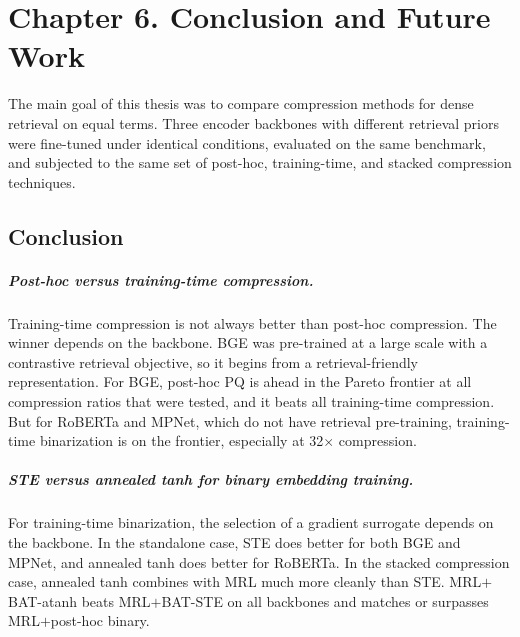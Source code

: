 
\chapter{Chapter 6. Conclusion and Future Work}
\label{ch:conclusions}

The main goal of this thesis was to compare compression methods for
dense retrieval on equal terms. Three encoder backbones with different
retrieval priors were fine-tuned under identical conditions, evaluated
on the same benchmark, and subjected to the same set of post-hoc,
training-time, and stacked compression techniques.

\section{Conclusion}
\label{sec:conclusion}

\paragraph{Post-hoc versus training-time compression.}
Training-time compression is not always better than post-hoc
compression. The winner depends on the backbone. BGE was pre-trained
at a large scale with a contrastive retrieval objective, so it begins
from a retrieval-friendly representation. For BGE, post-hoc PQ is
ahead in the Pareto frontier at all compression ratios that were
tested, and it beats all training-time compression. But for RoBERTa
and MPNet, which do not have retrieval pre-training, training-time
binarization is on the frontier, especially at 32$\times$ compression.

\paragraph{STE versus annealed tanh for binary embedding training.}
For training-time binarization, the selection of a gradient surrogate
depends on the backbone. In the standalone case, STE does better for
both BGE and MPNet, and annealed tanh does better for RoBERTa. In the
stacked compression case, annealed tanh combines with MRL much more
cleanly than STE. MRL$+$BAT-atanh beats MRL$+$BAT-STE on all backbones
and matches or surpasses MRL$+$post-hoc binary.

